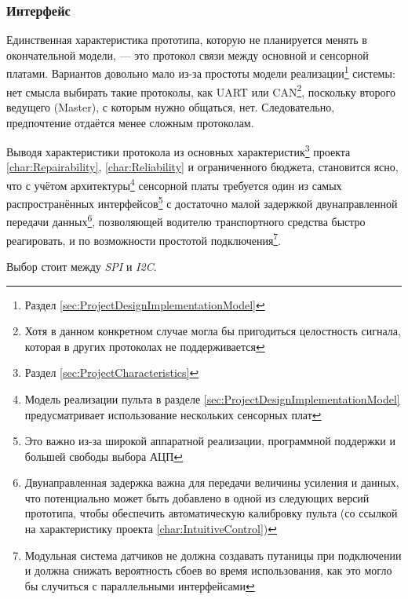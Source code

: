 \documentclass[a4paper, 10pt, final]{article} %
\begin{document}
    \subsubsection{Интерфейс}\label{sec:MotherboardDesignInterface}
    Единственная характеристика прототипа, которую не планируется менять в окончательной модели, --- это протокол связи между основной и сенсорной платами.
    Вариантов довольно мало из-за простоты модели реализации\footnote{Раздел \ref{sec:ProjectDesignImplementationModel}} системы: нет смысла выбирать такие протоколы, как UART или CAN\footnote{Хотя в данном конкретном случае могла бы пригодиться целостность сигнала, которая в других протоколах не поддерживается}, поскольку второго ведущего (Master), с которым нужно общаться, нет.
    Следовательно, предпочтение отдаётся менее сложным протоколам.

    Выводя характеристики протокола из основных характеристик\footnote{Раздел \ref{sec:ProjectCharacteristics}} проекта \ref{char:Repairability}, \ref{char:Reliability} и ограниченного бюджета, становится ясно, что с учётом архитектуры\footnote{Модель реализации пульта в разделе \ref{sec:ProjectDesignImplementationModel} предусматривает использование нескольких сенсорных плат} сенсорной платы требуется один из самых распространённых интерфейсов\footnote{Это важно из-за широкой аппаратной реализации, программной поддержки и большей свободы выбора АЦП} с достаточно малой задержкой двунаправленной передачи данных\footnote{Двунаправленная задержка важна для передачи величины усиления и данных, что потенциально может быть добавлено в одной из следующих версий прототипа, чтобы обеспечить автоматическую калибровку пульта (со ссылкой на характеристику проекта \ref{char:IntuitiveControl})}, позволяющей водителю транспортного средства быстро реагировать, и по возможности простотой подключения\footnote{Модульная система датчиков не должна создавать путаницы при подключении и должна снижать вероятность сбоев во время использования, как это могло бы случиться с параллельными интерфейсами}.

    \vspace{2ex}
    \Centering
    Выбор стоит между \emph{SPI} и \emph{I2C}.

    \vspace{2ex}
    \justifying
\end{document}
